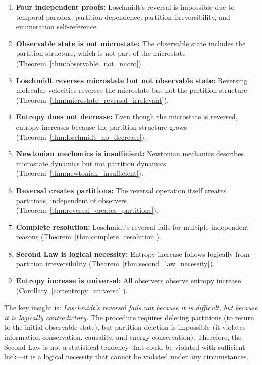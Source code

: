 \documentclass[twocolumn,10pt]{article}
\theoremstyle{definition}
\theoremstyle{remark}
\begin{document}
\begin{enumerate}
\item \textbf{Four independent proofs:} Loschmidt's reversal is impossible due to temporal paradox, partition dependence, partition irreversibility, and enumeration self-reference.

\item \textbf{Observable state is not microstate:} The observable state includes the partition structure, which is not part of the microstate (Theorem~\ref{thm:observable_not_micro}).

\item \textbf{Loschmidt reverses microstate but not observable state:} Reversing molecular velocities reverses the microstate but not the partition structure (Theorem~\ref{thm:microstate_reversal_irrelevant}).

\item \textbf{Entropy does not decrease:} Even though the microstate is reversed, entropy increases because the partition structure grows (Theorem~\ref{thm:loschmidt_no_decrease}).

\item \textbf{Newtonian mechanics is insufficient:} Newtonian mechanics describes microstate dynamics but not partition dynamics (Theorem~\ref{thm:newtonian_insufficient}).

\item \textbf{Reversal creates partitions:} The reversal operation itself creates partitions, independent of observers (Theorem~\ref{thm:reversal_creates_partitions}).

\item \textbf{Complete resolution:} Loschmidt's reversal fails for multiple independent reasons (Theorem~\ref{thm:complete_resolution}).

\item \textbf{Second Law is logical necessity:} Entropy increase follows logically from partition irreversibility (Theorem~\ref{thm:second_law_necessity}).

\item \textbf{Entropy increase is universal:} All observers observe entropy increase (Corollary~\ref{cor:entropy_universal}).
\end{enumerate}

\noindent The key insight is: \textit{Loschmidt's reversal fails not because it is difficult, but because it is logically contradictory.} The procedure requires deleting partitions (to return to the initial observable state), but partition deletion is impossible (it violates information conservation, causality, and energy conservation). Therefore, the Second Law is not a statistical tendency that could be violated with sufficient luck—it is a logical necessity that cannot be violated under any circumstances.
\end{document}
